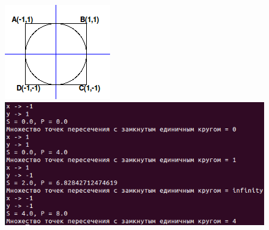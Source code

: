 \begin{figure}[ht!]
\begin{center}
\includegraphics[scale=0.6]{images/circ2}
\includegraphics[scale=0.4]{images/ex2}
\end{center}
\vspace*{-8mm}
\caption{}\label{fig:ex2}
\end{figure}

